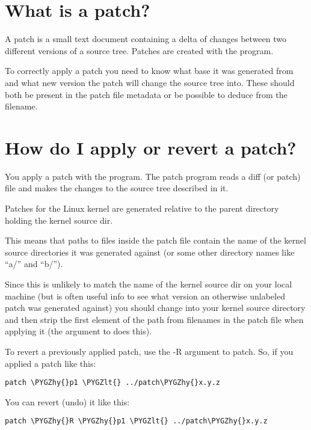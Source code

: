 \documentclass[a4paper,8pt,english]{sphinxmanual}
\def\PYGZlt{\char`\<}
\def\PYGZhy{\char`\-}
\begin{document}
\section{What is a patch?}
\label{process/applying-patches:what-is-a-patch}
A patch is a small text document containing a delta of changes between two
different versions of a source tree. Patches are created with the 
program.

To correctly apply a patch you need to know what base it was generated from
and what new version the patch will change the source tree into. These
should both be present in the patch file metadata or be possible to deduce
from the filename.


\section{How do I apply or revert a patch?}
\label{process/applying-patches:how-do-i-apply-or-revert-a-patch}
You apply a patch with the  program. The patch program reads a diff
(or patch) file and makes the changes to the source tree described in it.

Patches for the Linux kernel are generated relative to the parent directory
holding the kernel source dir.

This means that paths to files inside the patch file contain the name of the
kernel source directories it was generated against (or some other directory
names like ``a/'' and ``b/'').

Since this is unlikely to match the name of the kernel source dir on your
local machine (but is often useful info to see what version an otherwise
unlabeled patch was generated against) you should change into your kernel
source directory and then strip the first element of the path from filenames
in the patch file when applying it (the  argument to  does
this).

To revert a previously applied patch, use the -R argument to patch.
So, if you applied a patch like this:

\begin{Verbatim}[commandchars=\\\{\}]
patch \PYGZhy{}p1 \PYGZlt{} ../patch\PYGZhy{}x.y.z
\end{Verbatim}

You can revert (undo) it like this:

\begin{Verbatim}[commandchars=\\\{\}]
patch \PYGZhy{}R \PYGZhy{}p1 \PYGZlt{} ../patch\PYGZhy{}x.y.z
\end{Verbatim}
\end{document}
